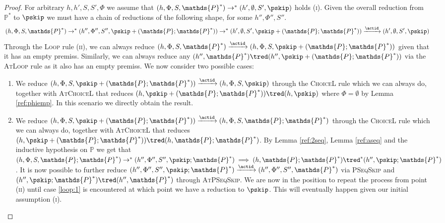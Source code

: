 {\begin{proof}
For arbitrary $h, h', S, S', \Phi$ we assume that $(h, \Phi, S, \mathds{P}^*) \rightarrow^* (h', \emptyset, S', \pskip)$ holds (\textsc{i}). Given the overall reduction from $\mathds{P}^*$ to $\pskip$ we must have a chain of reductions of the following shape, for some $h'', \Phi'', S''$.
\[
(h, \Phi, S, \mathds{P}^*) \rightarrow^* (h'', \Phi'', S'', \pskip + (\mathds{P} ; \mathds{P}^*)) \rightarrow^*  (h', \emptyset, S', \pskip + (\mathds{P} ; \mathds{P}^*)) \xrightarrow{\actid} (h', \emptyset, S', \pskip)
\]
Through the \textsc{Loop} rule (\textsc{ii}), we can always reduce $(h, \Phi, S, \mathds{P}^*) \xrightarrow{\actid} (h, \Phi, S, \pskip + (\mathds{P} ; \mathds{P}^*))$ given that it has an empty premiss. Similarly, we can always reduce any $(h'', \mathds{P}^*) \tred (h'', \pskip + (\mathds{P} ; \mathds{P}^*))$ via the \textsc{AtLoop} rule as it also has an empty premiss. We now consider two possible cases:
\begin{enumerate}
\item \label{loop:1} We reduce $(h, \Phi, S, \pskip + (\mathds{P} ; \mathds{P}^*)) \xrightarrow{\actid} (h, \Phi, S, \pskip)$ through the \textsc{ChoiceL} rule which we can always do, together with \textsc{AtChoiceL} that reduces $(h, \pskip + (\mathds{P} ; \mathds{P}^*)) \tred (h, \pskip)$ where $\Phi = \emptyset$ by Lemma \ref{ref:phiemp}. In this scenario we directly obtain the result.
\item We reduce $(h, \Phi, S, \pskip + (\mathds{P} ; \mathds{P}^*)) \xrightarrow{\actid} (h, \Phi, S, \mathds{P} ; \mathds{P}^*)$ through the \textsc{ChoiceL} rule which we can always do, together with \textsc{AtChoiceL} that reduces $(h, \pskip + (\mathds{P} ; \mathds{P}^*)) \tred (h, \mathds{P} ; \mathds{P}^*)$. By Lemma \ref{ref:2seq}, Lemma \ref{ref:aseq} and the inductive hypothesis on $\mathds{P}$ we get that $(h, \Phi, S, \mathds{P} ; \mathds{P}^*) \rightarrow^* (h'', \Phi'', S'', \pskip ; \mathds{P}^*) \implies (h, \mathds{P} ; \mathds{P}^*) \tred^* (h'', \pskip ; \mathds{P}^*)$. It is now possible to further reduce $(h'', \Phi'', S'', \pskip ; \mathds{P}^*) \xrightarrow{\actid} (h'', \Phi'', S'', \mathds{P}^*)$ via \textsc{PSeqSkip} and $(h'', \pskip ; \mathds{P}^*) \tred (h'', \mathds{P}^*)$ through \textsc{AtPSeqSkip}. We are now in the position to repeat the process from point (\textsc{ii}) until case \ref{loop:1} is encountered at which point we have a reduction to $\pskip$. This will eventually happen given our initial assumption (\textsc{i}). \\
\end{enumerate}


\end{proof}}
